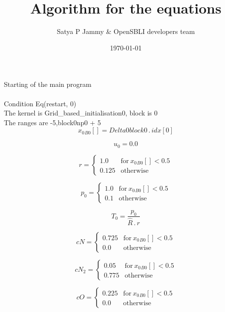 \documentclass{article}
\title{Algorithm for the equations}
\author{Satya P Jammy \& OpenSBLI developers team}
\date{\today}
\begin{document}
\maketitle
\noindent Starting of the main program\\
\\\noindent Condition Eq(restart, 0)\\\noindent The kernel is Grid_based_initialisation0, block is 0\\\noindent The ranges are -5,block0np0 + 5\\\begin{dmath}{x_{0}{_{B0}}}[{}] = Delta0block0 \,.\, {idx}[{0}]\end{dmath}

\begin{dmath}u_{0} = 0.0\end{dmath}

\begin{dmath}r = \begin{cases} 1.0 & \text{for}\: {x_{0}{_{B0}}}[{}] < 0.5 \\0.125 & \text{otherwise} \end{cases}\end{dmath}

\begin{dmath}p_{0} = \begin{cases} 1.0 & \text{for}\: {x_{0}{_{B0}}}[{}] < 0.5 \\0.1 & \text{otherwise} \end{cases}\end{dmath}

\begin{dmath}T_{0} = \frac{p_{0}}{\hat{R} \,.\, r}\end{dmath}

\begin{dmath}cN = \begin{cases} 0.725 & \text{for}\: {x_{0}{_{B0}}}[{}] < 0.5 \\0.0 & \text{otherwise} \end{cases}\end{dmath}

\begin{dmath}cN_{2} = \begin{cases} 0.05 & \text{for}\: {x_{0}{_{B0}}}[{}] < 0.5 \\0.775 & \text{otherwise} \end{cases}\end{dmath}

\begin{dmath}cO = \begin{cases} 0.225 & \text{for}\: {x_{0}{_{B0}}}[{}] < 0.5 \\0.0 & \text{otherwise} \end{cases}\end{dmath}
\end{document}
